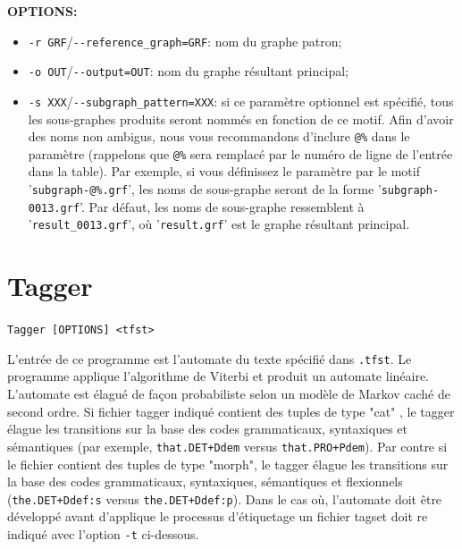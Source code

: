 \bigskip
\noindent \textbf{OPTIONS:}
\begin{itemize}
\item \verb+-r GRF+/\verb+--reference_graph=GRF+: nom du graphe patron;
  
\item \verb+-o OUT+/\verb+--output=OUT+: nom du graphe résultant principal;
  
  \item \verb+-s XXX+/\verb+--subgraph_pattern=XXX+: si ce paramètre optionnel est spécifié, tous
  	  les sous-graphes produits seront nommés en fonction de ce motif. Afin d'avoir des noms non
  	  ambigus, nous vous recommandons d'inclure \verb+@%+ dans le paramètre
   (rappelons que \verb+@%+ sera remplacé par le numéro de ligne de l'entrée dans la table).
   Par exemple, si vous définissez le paramètre par le motif '\verb+subgraph-@%.grf+', 
   les noms de sous-graphe seront de la forme '\verb+subgraph-0013.grf+'. Par défaut,
   les noms de sous-graphe ressemblent à '\verb+result_0013.grf+', où '\verb+result.grf+' est le
   graphe résultant principal.
\end{itemize}




\section{Tagger}
\verb+Tagger [OPTIONS] <tfst>+
\label{section-Tagger}

\bigskip
\noindent L'entrée de ce programme est l'automate du texte spécifié dans \verb+.tfst+. Le programme
applique l'algorithme de Viterbi et produit un automate linéaire. L'automate est élagué de façon
probabiliste selon un modèle de Markov caché de second ordre. Si fichier tagger indiqué
contient des tuples de type "cat" , le tagger élague les transitions sur la base des codes grammaticaux, syntaxiques
et sémantiques (par exemple, \verb$that.DET+Ddem$ versus 
	\verb$that.PRO+Pdem$). Par contre si le fichier contient des tuples de type "morph", le tagger élague les transitions
sur la base des codes grammaticaux, syntaxiques, sémantiques et flexionnels (\verb$the.DET+Ddef:s$ versus \verb$the.DET+Ddef:p$). Dans le cas où,
l'automate doit être développé avant d'applique le processus d'étiquetage un fichier tagset doit re indiqué avec l'option \verb+-t+ ci-dessous.

